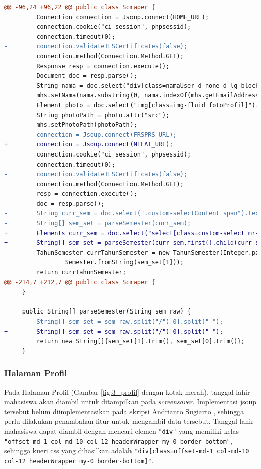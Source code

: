 \begin{lstlisting}[language=diff, caption=Perubahan Implementasi Jsoup Halaman Utama, label=diff_halaman_utama]
@@ -96,24 +96,22 @@ public class Scraper {
         Connection connection = Jsoup.connect(HOME_URL);
         connection.cookie("ci_session", phpsessid);
         connection.timeout(0);
-        connection.validateTLSCertificates(false);
         connection.method(Connection.Method.GET);
         Response resp = connection.execute();
         Document doc = resp.parse();
         String nama = doc.select("div[class=namaUser d-none d-lg-block mr-3]").text();
         mhs.setNama(nama.substring(0, nama.indexOf(mhs.getEmailAddress())));
         Element photo = doc.select("img[class=img-fluid fotoProfil]").first();
         String photoPath = photo.attr("src");
         mhs.setPhotoPath(photoPath);
-        connection = Jsoup.connect(FRSPRS_URL);
+        connection = Jsoup.connect(NILAI_URL);
         connection.cookie("ci_session", phpsessid);
         connection.timeout(0);
-        connection.validateTLSCertificates(false);
         connection.method(Connection.Method.GET);
         resp = connection.execute();
         doc = resp.parse();
-        String curr_sem = doc.select(".custom-selectContent span").text();
-        String[] sem_set = parseSemester(curr_sem);
+        Elements curr_sem = doc.select("select[class=custom-select mr-3]");
+        String[] sem_set = parseSemester(curr_sem.first().child(curr_sem.first().childrenSize() - 1).text());
         TahunSemester currTahunSemester = new TahunSemester(Integer.parseInt(sem_set[0]),
                 Semester.fromString(sem_set[1]));
         return currTahunSemester;
@@ -214,7 +212,7 @@ public class Scraper {
     }

     public String[] parseSemester(String sem_raw) {
-        String[] sem_set = sem_raw.split("/")[0].split("-");
+        String[] sem_set = sem_raw.split("/")[0].split(" ");
         return new String[]{sem_set[1].trim(), sem_set[0].trim()};
     }
\end{lstlisting}

\subsubsection{Halaman Profil}
Pada Halaman Profil (Gambar \ref{fig:3_profil} dengan kotak merah), tanggal lahir mahasiswa akan diambil untuk ditampilkan pada \textit{screensaver}. Implementasi jsoup tersebut belum diimplementasikan pada skripsi Andrianto Sugiarto \cite{ifstupor}, sehingga perlu dilakukan penambahan fitur untuk mengambil data tersebut. Tanggal lahir mahasiswa dapat diambil dengan mencari elemen \texttt{"div"} yang memiliki kelas \texttt{"offset-md-1 col-md-10 col-12 headerWrapper my-0 border-bottom"}, sehingga kueri css yang dihasilkan adalah \texttt{"div[class=offset-md-1 col-md-10 col-12 headerWrapper my-0 border-bottom]"}.



